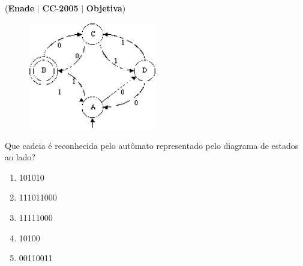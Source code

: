 \documentclass{exam}
\begin{document}
\begin{questions}
\question (\textbf{Enade} $|$ \textbf{CC}-\textbf{2005} $|$ \textbf{Objetiva})

\begin{figure}[H]
	\begin{center}
		\includegraphics[width=0.5\textwidth]{CIENCIA_DA_COMPUTACAO_Prova2005-utf8_figuras/fig-0042.jpg}
	\end{center}
\end{figure}
Que cadeia é reconhecida pelo
autômato representado pelo
diagrama de estados ao lado?
	\begin{enumerate}[label=\alph*)]
		\item  101010
		\item  111011000
		\item  11111000
		\item  10100
		\item  00110011
	\end{enumerate}


\end{questions}
\end{document}
